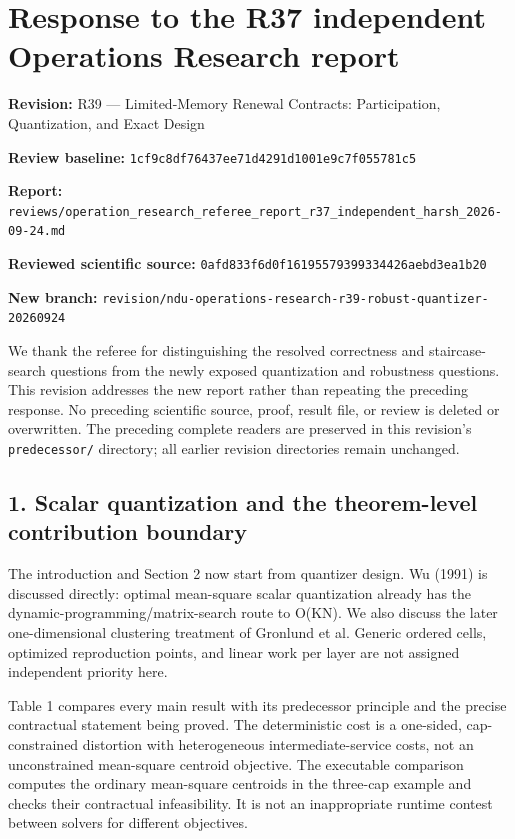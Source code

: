 \documentclass[11pt,letterpaper]{article}
\begin{document}
\section*{Response to the R37 independent Operations Research report}


\textbf{Revision:} R39 — Limited-Memory Renewal Contracts: Participation, Quantization, and Exact Design

\textbf{Review baseline:} \nolinkurl{1cf9c8df76437ee71d4291d1001e9c7f055781c5}

\textbf{Report:} \nolinkurl{reviews/operation_research_referee_report_r37_independent_harsh_2026-09-24.md}

\textbf{Reviewed scientific source:} \nolinkurl{0afd833f6d0f16195579399334426aebd3ea1b20}

\textbf{New branch:} \nolinkurl{revision/ndu-operations-research-r39-robust-quantizer-20260924}



We thank the referee for distinguishing the resolved correctness and staircase-search questions from the newly exposed quantization and robustness questions. This revision addresses the new report rather than repeating the preceding response. No preceding scientific source, proof, result file, or review is deleted or overwritten. The preceding complete readers are preserved in this revision's \nolinkurl{predecessor/} directory; all earlier revision directories remain unchanged.



\subsection*{1. Scalar quantization and the theorem-level contribution boundary}


The introduction and Section 2 now start from quantizer design. Wu (1991) is discussed directly: optimal mean-square scalar quantization already has the dynamic-programming/matrix-search route to O(KN). We also discuss the later one-dimensional clustering treatment of Gronlund et al. Generic ordered cells, optimized reproduction points, and linear work per layer are not assigned independent priority here.



Table 1 compares every main result with its predecessor principle and the precise contractual statement being proved. The deterministic cost is a one-sided, cap-constrained distortion with heterogeneous intermediate-service costs, not an unconstrained mean-square centroid objective. The executable comparison computes the ordinary mean-square centroids in the three-cap example and checks their contractual infeasibility. It is not an inappropriate runtime contest between solvers for different objectives.
\end{document}

